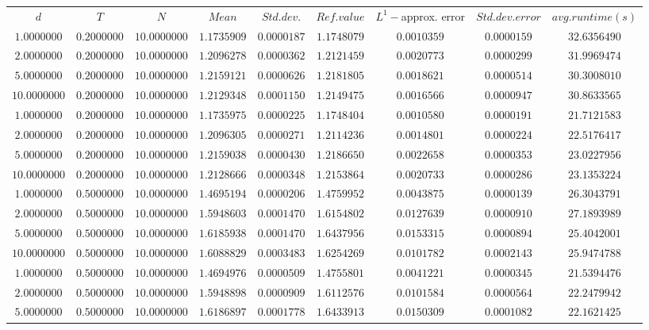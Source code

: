 \begin{tabular}{ccccccccc}
$d$ & $T$ & $N$ & $Mean$ & $Std. dev.$ & $Ref. value$ & $L^1-$approx. error & $Std. dev. error$ & $avg. runtime (s)$\\
$1.0000000$ & $0.2000000$ & $10.0000000$ & $1.1735909$ & $0.0000187$ & $1.1748079$ & $0.0010359$ & $0.0000159$ & $32.6356490$\\
$2.0000000$ & $0.2000000$ & $10.0000000$ & $1.2096278$ & $0.0000362$ & $1.2121459$ & $0.0020773$ & $0.0000299$ & $31.9969474$\\
$5.0000000$ & $0.2000000$ & $10.0000000$ & $1.2159121$ & $0.0000626$ & $1.2181805$ & $0.0018621$ & $0.0000514$ & $30.3008010$\\
$10.0000000$ & $0.2000000$ & $10.0000000$ & $1.2129348$ & $0.0001150$ & $1.2149475$ & $0.0016566$ & $0.0000947$ & $30.8633565$\\
$1.0000000$ & $0.2000000$ & $10.0000000$ & $1.1735975$ & $0.0000225$ & $1.1748404$ & $0.0010580$ & $0.0000191$ & $21.7121583$\\
$2.0000000$ & $0.2000000$ & $10.0000000$ & $1.2096305$ & $0.0000271$ & $1.2114236$ & $0.0014801$ & $0.0000224$ & $22.5176417$\\
$5.0000000$ & $0.2000000$ & $10.0000000$ & $1.2159038$ & $0.0000430$ & $1.2186650$ & $0.0022658$ & $0.0000353$ & $23.0227956$\\
$10.0000000$ & $0.2000000$ & $10.0000000$ & $1.2128666$ & $0.0000348$ & $1.2153864$ & $0.0020733$ & $0.0000286$ & $23.1353224$\\
$1.0000000$ & $0.5000000$ & $10.0000000$ & $1.4695194$ & $0.0000206$ & $1.4759952$ & $0.0043875$ & $0.0000139$ & $26.3043791$\\
$2.0000000$ & $0.5000000$ & $10.0000000$ & $1.5948603$ & $0.0001470$ & $1.6154802$ & $0.0127639$ & $0.0000910$ & $27.1893989$\\
$5.0000000$ & $0.5000000$ & $10.0000000$ & $1.6185938$ & $0.0001470$ & $1.6437956$ & $0.0153315$ & $0.0000894$ & $25.4042001$\\
$10.0000000$ & $0.5000000$ & $10.0000000$ & $1.6088829$ & $0.0003483$ & $1.6254269$ & $0.0101782$ & $0.0002143$ & $25.9474788$\\
$1.0000000$ & $0.5000000$ & $10.0000000$ & $1.4694976$ & $0.0000509$ & $1.4755801$ & $0.0041221$ & $0.0000345$ & $21.5394476$\\
$2.0000000$ & $0.5000000$ & $10.0000000$ & $1.5948898$ & $0.0000909$ & $1.6112576$ & $0.0101584$ & $0.0000564$ & $22.2479942$\\
$5.0000000$ & $0.5000000$ & $10.0000000$ & $1.6186897$ & $0.0001778$ & $1.6433913$ & $0.0150309$ & $0.0001082$ & $22.1621425$\\

\end{tabular}
